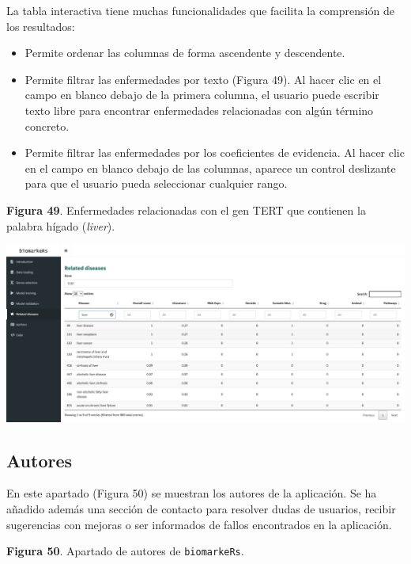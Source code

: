 La tabla interactiva tiene muchas funcionalidades que facilita la comprensión de los resultados:
\begin{itemize}
	\item Permite ordenar las columnas de forma ascendente y descendente.
	\item Permite filtrar las enfermedades por texto (Figura 49).  Al hacer clic en el campo en blanco debajo de la primera columna, el usuario puede escribir texto libre para encontrar enfermedades relacionadas con algún término concreto.
	\item Permite filtrar las enfermedades por los coeficientes de evidencia. Al hacer clic en el campo en blanco debajo de las columnas, aparece un control deslizante para que el usuario pueda seleccionar cualquier rango.
\end{itemize}

\begin{center}
	\textbf{Figura 49}. Enfermedades relacionadas con el gen TERT que contienen la palabra hígado (\textit{liver}).
\end{center}

\begin{center}
	\includegraphics[width=.90\textwidth]{figuras/49_related_diseases_filtered.png} \\
\end{center}

\subsection{Autores}

En este apartado (Figura 50) se muestran los autores de la aplicación. Se ha añadido además una sección de contacto para resolver dudas de usuarios, recibir sugerencias con mejoras o ser informados de fallos encontrados en la aplicación.

\begin{center}
	\textbf{Figura 50}. Apartado de autores de \texttt{biomarkeRs}.
\end{center}

